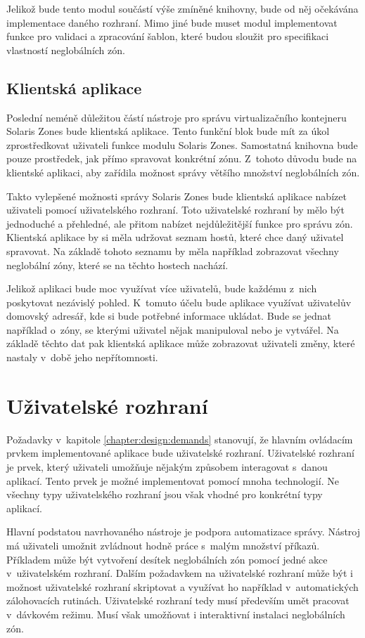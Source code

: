 Jelikož bude tento modul součástí výše zmíněné knihovny, bude od něj očekávána implementace daného rozhraní. Mimo jiné 
bude muset modul implementovat funkce pro validaci a zpracování šablon, které budou sloužit pro specifikaci vlastností
neglobálních zón.
\subsection{Klientská aplikace}
\label{chapter:design:architecture:client}
Poslední neméně důležitou částí nástroje pro správu virtualizačního kontejneru Solaris Zones bude klientská aplikace. Tento
funkční blok bude mít za úkol zprostředkovat uživateli funkce modulu Solaris Zones. Samostatná knihovna bude pouze prostředek,
jak přímo spravovat konkrétní zónu. Z~tohoto důvodu bude na klientské aplikaci, aby zařídila možnost správy většího množství
neglobálních zón.

Takto vylepšené možnosti správy Solaris Zones bude klientská aplikace nabízet uživateli pomocí uživatelského rozhraní. Toto
uživatelské rozhraní by mělo být jednoduché a přehledné, ale přitom nabízet nejdůležitější funkce pro správu zón. Klientská
aplikace by si měla udržovat seznam hostů, které chce daný uživatel spravovat. Na základě tohoto seznamu by měla například
zobrazovat všechny neglobální zóny, které se na těchto hostech nachází.

Jelikož aplikaci bude moc využívat více uživatelů, bude každému z~nich poskytovat nezávislý pohled. K~tomuto účelu bude aplikace
využívat uživatelův domovský adresář, kde si bude potřebné informace ukládat. Bude se jednat například o~zóny, se kterými
uživatel nějak manipuloval nebo je vytvářel. Na základě těchto dat pak klientská aplikace může zobrazovat uživateli změny,
které nastaly v~době jeho nepřítomnosti.
\section{Uživatelské rozhraní}
\label{chapter:design:ui}
Požadavky v~kapitole \ref{chapter:design:demands} stanovují, že hlavním ovládacím prvkem implementované aplikace bude
uživatelské rozhraní. Uživatelské rozhraní je prvek, který uživateli umožňuje nějakým způsobem interagovat s~danou aplikací.
Tento prvek je možné implementovat pomocí mnoha technologií. Ne všechny typy uživatelského rozhraní jsou však vhodné pro 
konkrétní typy aplikací.

Hlavní podstatou navrhovaného nástroje je podpora automatizace správy. Nástroj má uživateli umožnit zvládnout
hodně práce s~malým množství příkazů. Příkladem může být vytvoření desítek neglobálních zón pomocí jedné akce v~uživatelském 
rozhraní. Dalším požadavkem na uživatelské rozhraní může být i možnost uživatelské rozhraní skriptovat a využívat ho například
v~automatických zálohovacích rutinách. Uživatelské rozhraní tedy musí především umět pracovat v~dávkovém režimu. Musí však
umožňovat i interaktivní instalaci neglobálních zón.

